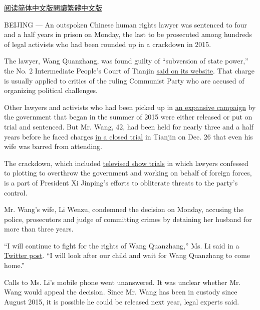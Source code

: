 \href{https://cn.nytimes3xbfgragh.onion/china/20190129/china-wang-quanzhang-human-rights/}{阅读简体中文版}\href{https://cn.nytimes3xbfgragh.onion/china/20190129/china-wang-quanzhang-human-rights/zh-hant/}{閱讀繁體中文版}

BEIJING --- An outspoken Chinese human rights lawyer was sentenced to
four and a half years in prison on Monday, the last to be prosecuted
among hundreds of legal activists who had been rounded up in a crackdown
in 2015.

The lawyer, Wang Quanzhang, was found guilty of ``subversion of state
power,'' the No. 2 Intermediate People's Court of Tianjin
\href{http://tj2zy.chinacourt.org/article/detail/2019/01/id/3716862.shtml}{said
on its website}. That charge is usually applied to critics of the ruling
Communist Party who are accused of organizing political challenges.

Other lawyers and activists who had been picked up in
\href{https://www.nytimes3xbfgragh.onion/2015/07/23/world/asia/china-crackdown-human-rights-lawyers.html?action=click\&module=RelatedCoverage\&pgtype=Article\&region=Footer}{an
expansive campaign} by the government that began in the summer of 2015
were either released or put on trial and sentenced. But Mr. Wang, 42,
had been held for nearly three and a half years before he faced charges
\href{http://tj2zy.chinacourt.org/article/detail/2019/01/id/3716862.shtml}{in
a closed trial} in Tianjin on Dec. 26 that even his wife was barred from
attending.

The crackdown, which included
\href{https://www.nytimes3xbfgragh.onion/2016/08/06/world/asia/china-trial-activists-lawyers.html}{televised
show trials} in which lawyers confessed to plotting to overthrow the
government and working on behalf of foreign forces, is a part of
President Xi Jinping's efforts to obliterate threats to the party's
control.

Mr. Wang's wife, Li Wenzu, condemned the decision on Monday, accusing
the police, prosecutors and judge of committing crimes by detaining her
husband for more than three years.

``I will continue to fight for the rights of Wang Quanzhang,'' Ms. Li
said in a
\href{https://twitter.com/709liwenzu/status/1089752511773270016}{Twitter
post}. ``I will look after our child and wait for Wang Quanzhang to come
home.''

Calls to Ms. Li's mobile phone went unanswered. It was unclear whether
Mr. Wang would appeal the decision. Since Mr. Wang has been in custody
since August 2015, it is possible he could be released next year, legal
experts said.

